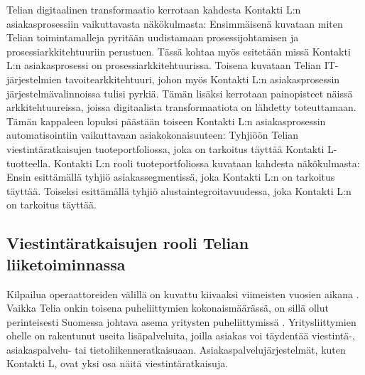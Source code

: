 \documentclass[finnish,12pt,a4paper,pdftex]{article}
\begin{document}
\noindent Telian digitaalinen transformaatio kerrotaan kahdesta Kontakti L:n asiakasprosessiin vaikuttavasta näkökulmasta: Ensimmäisenä kuvataan miten Telian toimintamalleja pyritään uudistamaan prosessijohtamisen ja prosessiarkkitehtuuriin perustuen. Tässä kohtaa myös esitetään missä Kontakti L:n asiakasprosessi on prosessiarkkitehtuurissa. Toisena kuvataan Telian IT-järjestelmien tavoitearkkitehtuuri, johon myös Kontakti L:n asiakasprosessin järjestelmävalinnoissa tulisi pyrkiä. Tämän lisäksi kerrotaan painopisteet näissä arkkitehtuureissa, joissa digitaalista transformaatiota on lähdetty toteuttamaan.\\

\noindent Tämän kappaleen lopuksi päästään toiseen Kontakti L:n asiakasprosessin automatisointiin vaikuttavaan asiakokonaisuuteen: Tyhjiöön Telian viestintäratkaisujen tuoteportfoliossa, joka on tarkoitus täyttää Kontakti L-tuotteella. Kontakti L:n rooli tuoteportfoliossa kuvataan kahdesta näkökulmasta: Ensin esittämällä tyhjiö asiakassegmentissä, joka Kontakti L:n on tarkoitus täyttää. Toiseksi esittämällä tyhjiö alustaintegroitavuudessa, joka Kontakti L:n on tarkoitus täyttää.





\subsection{Viestintäratkaisujen rooli Telian liiketoiminnassa}

 Kilpailua operaattoreiden välillä on kuvattu kiivaaksi viimeisten vuosien aikana \citep{hesari}. Vaikka Telia onkin toisena puheliittymien kokonaismäärässä, on sillä ollut perinteisesti Suomessa johtava asema yritysten puheliittymissä \citep{hesari}. Yritysliittymien ohelle on rakentunut useita lisäpalveluita, joilla asiakas voi täydentää viestintä-, asiakaspalvelu- tai tietoliikenneratkaisuaan. Asiakaspalvelujärjestelmät, kuten Kontakti L, ovat yksi osa näitä viestintäratkaisuja.\\
 
\end{document}
